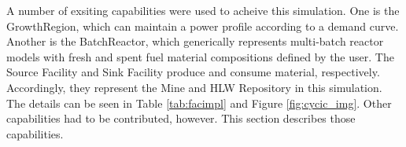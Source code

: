 
A number of exsiting capabilities were used to acheive this simulation. One is
the GrowthRegion, which can maintain a power profile according to a demand
curve. Another is the BatchReactor, which generically represents multi-batch
reactor models with fresh and spent fuel material compositions defined by the user. The
Source Facility and Sink Facility produce and consume material, respectively.  
Accordingly, they represent the Mine and HLW Repository in this simulation. The 
details can be seen in Table \ref{tab:facimpl} and Figure \ref{fig:cycic_img}.  
Other capabilities had to be contributed, however. This section describes those 
capabilities.
